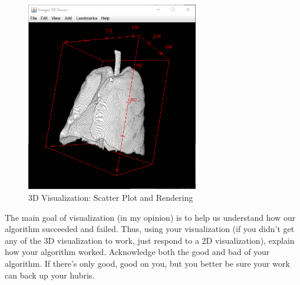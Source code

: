 \documentclass[10pt]{article}
\begin{document}
\begin{figure}[h]
	\centering
	\includegraphics[width = 0.67\textwidth]{figures/3d_vis}
	\caption{3D Visualization: Scatter Plot and Rendering}
	\label{fig:visualization}
\end{figure}

\indent The main goal of visualization (in my opinion) is to help us understand how our algorithm succeeded and failed.  Thus, using your visualization (if you didn't get any of the 3D visualization to work, just respond to a 2D visualization), explain how your algorithm worked.  Acknowledge both the good and bad of your algorithm.  If there's only good, good on you, but you better be sure your work can back up your hubris.\\
\ \\
\end{document}
